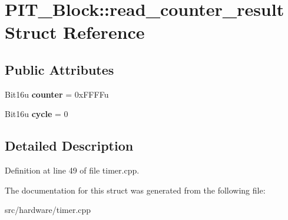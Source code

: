 \hypertarget{structPIT__Block_1_1read__counter__result}{\section{P\-I\-T\-\_\-\-Block\-:\-:read\-\_\-counter\-\_\-result Struct Reference}
\label{structPIT__Block_1_1read__counter__result}
}
\subsection*{Public Attributes}
\begin{DoxyCompactItemize}
\item 
\hypertarget{structPIT__Block_1_1read__counter__result_aea711100b018a3062712a4ecb0b3958c}{Bit16u {\bfseries counter} = 0x\-F\-F\-F\-Fu}\label{structPIT__Block_1_1read__counter__result_aea711100b018a3062712a4ecb0b3958c}

\item 
\hypertarget{structPIT__Block_1_1read__counter__result_ac00df8c322b271dd724e149614a1c7ab}{Bit16u {\bfseries cycle} = 0}\label{structPIT__Block_1_1read__counter__result_ac00df8c322b271dd724e149614a1c7ab}

\end{DoxyCompactItemize}


\subsection{Detailed Description}


Definition at line 49 of file timer.\-cpp.



The documentation for this struct was generated from the following file\-:\begin{DoxyCompactItemize}
\item 
src/hardware/timer.\-cpp\end{DoxyCompactItemize}
